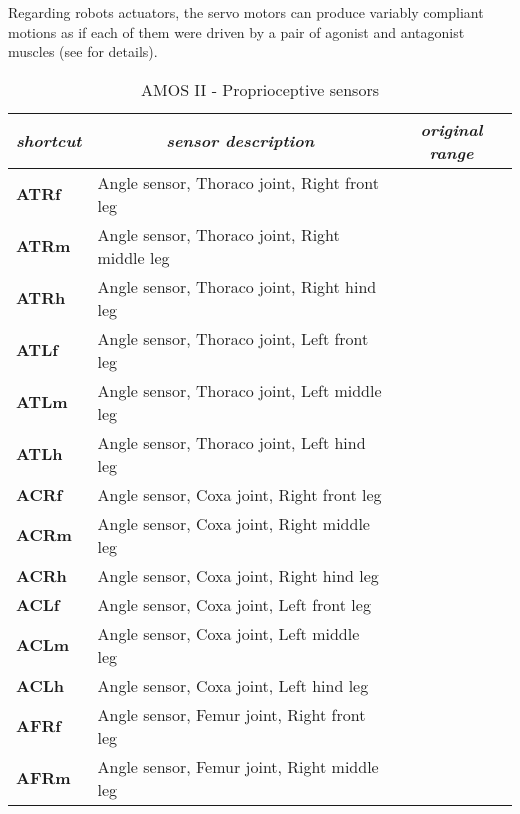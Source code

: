 Regarding robots actuators, the servo motors can produce variably compliant motions as if each of them were driven by a pair of agonist and antagonist muscles (see \cite{misc:amosii} for details). 

\begin{table}[H]
\centering
\caption{AMOS II - Proprioceptive sensors}
\label{tab:proprioceptors}
\begin{tabular}{|l|l|c|}
\hline
\textit{shortcut} & \multicolumn{1}{c|}{\textit{sensor description}} & \textit{original range} \\ \hline
\textbf{ATRf}         & Angle sensor, Thoraco joint, Right front leg     &                         \\ \hline
\textbf{ATRm}         & Angle sensor, Thoraco joint, Right middle leg    &                         \\ \hline
\textbf{ATRh}         & Angle sensor, Thoraco joint, Right hind leg      &                         \\ \hline
\textbf{ATLf}         & Angle sensor, Thoraco joint, Left front leg      &                         \\ \hline
\textbf{ATLm}         & Angle sensor, Thoraco joint, Left middle leg     &                         \\ \hline
\textbf{ATLh}         & Angle sensor, Thoraco joint, Left hind leg       &                         \\ \hline
\textbf{ACRf}         & Angle sensor, Coxa joint, Right front leg        &                         \\ \hline
\textbf{ACRm}         & Angle sensor, Coxa joint, Right middle leg       &                         \\ \hline
\textbf{ACRh}         & Angle sensor, Coxa joint, Right hind leg         &                         \\ \hline
\textbf{ACLf}         & Angle sensor, Coxa joint, Left front leg         &                         \\ \hline
\textbf{ACLm}         & Angle sensor, Coxa joint, Left middle leg        &                         \\ \hline
\textbf{ACLh}         & Angle sensor, Coxa joint, Left hind leg          &                         \\ \hline
\textbf{AFRf}         & Angle sensor, Femur joint, Right front leg       &                         \\ \hline
\textbf{AFRm}         & Angle sensor, Femur joint, Right middle leg      &                         \\ \hline

\end{tabular}
\end{table}
